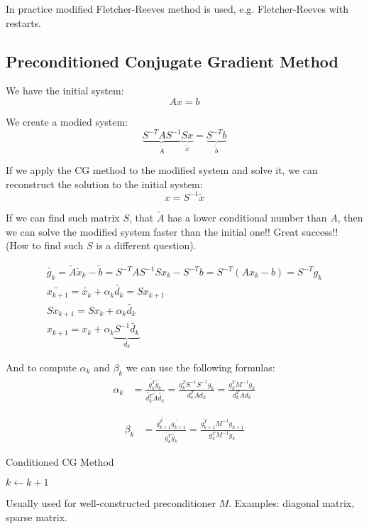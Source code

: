 In practice modified Fletcher-Reeves method is used, e.g. Fletcher-Reeves with restarts.

\subsection{Preconditioned Conjugate Gradient Method}

We have the initial system: 
\[ 
    A x = b
\] 

We create a modied system:
\[ 
    \underbrace{S^{-T} A S^{-1}}_{\tilde{A}} \underbrace{S x}_{\tilde{x}} = \underbrace{S^{-T} b}_{\tilde{b}}
\] 

If we apply the CG method to the modified system and solve it, we can reconstruct the solution to the initial system: 
\[ 
    x = S^{-1} \tilde{x}
\] 

If we can find such matrix $S$, that $\tilde{A}$ has a lower conditional number than $A$, then we can solve the modified system faster than the initial one!! Great success!! (How to find such $S$ is a different question).

\begin{gather*}
    \tilde{g_k} = \tilde{A} \tilde{x}_k - \tilde{b} = S^{-T} A S^{-1} S x_k - S^{-T} b = S^{-T} (A x_k - b) = S^{-T} g_k \\
    \tilde{x_{k+1}} = \tilde{x_k} + \alpha_k \tilde{d_k} = S x_{k+1} \\
    S x_{k+1} = S x_k + \alpha_k \tilde{d_k} \\
    x_{k+1} = x_k + \alpha_k \underbrace{S^{-1} \tilde{d_k}}_{d_k}
\end{gather*}

And to compute $\alpha_k$ and $\beta_k$ we can use the following formulas:
\begin{align*}
    \alpha_k &= \frac{\tilde{g_k^T}\tilde{g_k}}{\tilde{d_k^T} \tilde{A} \tilde{d_k}} = \frac{g_k^T S^{-1} S^{-1} g_k}{d_k^T A d_k} =\boxed{\frac{g_k^T M^{-1} g_k}{d_k^T A d_k}} 
\end{align*}

\begin{align*}
    \beta_k &= \frac{\tilde{g_{k+1}^T} \tilde{g_{k+1}}}{\tilde{g_k^T} \tilde{g_k}} = \boxed{\frac{g_{k+1}^T M^{-1} g_{k+1}}{g_k^T M^{-1} g_k}}
\end{align*}

\begin{algorithm}
    \caption{Conditioned CG Method}
    \begin{algorithmic}[1]
        \State $k \gets k + 1$
    \EndWhile
    \end{algorithmic}
\end{algorithm}

\notice \; Usually used for well-constructed preconditioner $M$. Examples: diagonal matrix, sparse matrix. 